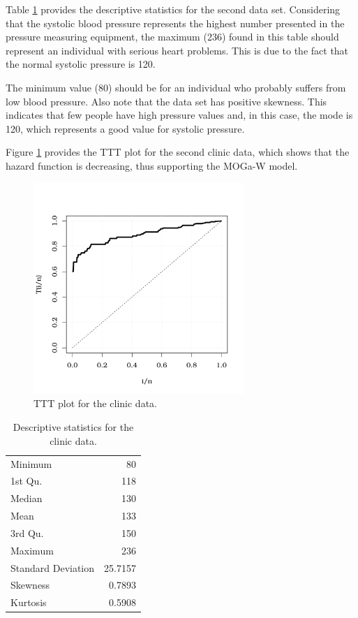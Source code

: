\documentclass[twoside,leqno,11pt]{article}
\begin{document}
Table \ref{tabds2} provides the descriptive statistics for the second data set. Consi\-dering that the systolic blood pressure represents the highest number presented in the pressure measuring equipment, the maximum (236) found in this 
table should represent an individual with serious heart problems. This is due to the fact that the normal systolic pressure is 120.
 
The minimum value (80) should be for an individual who probably suffers from low blood pressure. Also note that the data set has positive skewness. This indicates that few people have high pressure values and, in this case, the mode is 120, which represents a good value for systolic pressure.

Figure \ref{ttt2} provides the TTT plot for the second clinic data, which shows that the hazard function is decreasing, thus supporting the MOGa-W model.

\begin{figure}[H]
\begin{center}
\includegraphics[height=8cm, width=8cm]{TTT_app_2.pdf}
\caption{TTT plot for the clinic data.\label{ttt2}}
\end{center}
\end{figure}

\begin{table}[H] 
\center
\caption{Descriptive statistics for the clinic data.}
\label{tabds2}
\begin{tabular}{lr}
\hline\noalign{\smallskip}
   Minimum & 80\\
   1st Qu.& 118\\
   Median&  130\\
   Mean& 133 \\
   3rd  Qu.&  150 \\
   Maximum &  236\\
   Standard Deviation & 25.7157\\
   Skewness & 0.7893\\
   Kurtosis & 0.5908\\
\hline
\end{tabular}
\end{table}
\end{document}

